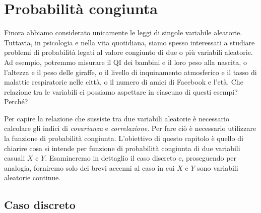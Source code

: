 %

\chapter{Probabilità congiunta}
\label{chapter:distr_congiunta}


%
%
%

Finora abbiamo considerato unicamente le leggi di singole variabile aleatorie. 
Tuttavia, in psicologia e nella vita quotidiana, siamo spesso interessati a studiare problemi di probabilità legati al valore congiunto di due o più variabili aleatorie. 
Ad esempio, potremmo misurare il QI dei bambini e il loro peso alla nascita, o l'altezza e il peso delle giraffe, o il livello di inquinamento atmosferico e il tasso di malattie respiratorie nelle città, o il numero di amici di Facebook e l'età. 
Che relazione tra le variabili ci possiamo aspettare in ciascuno di questi esempi? 
Perché? 

Per capire la relazione che sussiste tra due variabili aleatorie è necessario calcolare gli indici di \emph{covarianza} e \emph{correlazione}. 
Per fare ciò è necessario utilizzare la funzione di probabilità congiunta.
L'obiettivo di questo capitolo è quello di chiarire cosa si intende per funzione di probabilità congiunta di due variabili casuali $X$ e $Y$.
Esamineremo in dettaglio il caso discreto e, proseguendo per analogia, forniremo solo dei brevi accenni al caso in cui $X$ e $Y$ sono variabili aleatorie continue.


\section{Caso discreto}

